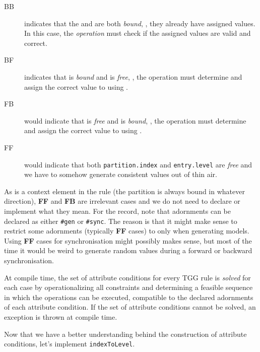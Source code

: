 \begin{description}

\item[BB] indicates that the  and  are both \emph{bound}, \idest, they already have assigned values.
In this case, the \emph{operation} must check if the assigned values are valid and correct.

\item[BF] indicates that  is \emph{bound} and  is \emph{free}, \idest, the operation must determine and assign the correct value to  using .

\item[FB] would indicate that  is \emph{free} and  is \emph{bound}, \idest, the operation must determine and assign the correct value to  using .

\item[FF] would indicate that both \texttt{partition.index} and \texttt{entry.level} are \emph{free} and we have to somehow generate consistent values out of thin air.

\end{description}

As  is a context element in the rule (the partition is always bound in whatever direction), \textbf{FF} and \textbf{FB} are irrelevant cases and we do not need to declare or implement what they mean.
For the record, note that adornments can be declared as either \texttt{\#gen} or \texttt{\#sync}.
The reason is that it might make sense to restrict some adornments (typically \textbf{FF} cases) to only when generating models.
Using \textbf{FF} cases for synchronisation might possibly makes sense, but most of the time it would be weird to generate random values during a forward or backward synchronisation.  

At compile time, the set of attribute conditions for every TGG rule is \emph{solved} for each case by
operationalizing all constraints and determining a feasible sequence in which the operations can be executed, compatible to the declared adornments of each attribute condition. 
If the set of attribute conditions cannot be solved, an exception is thrown at compile time.

Now that we have a better understanding behind the construction of attribute conditions, let's implement \texttt{indexToLevel}.


